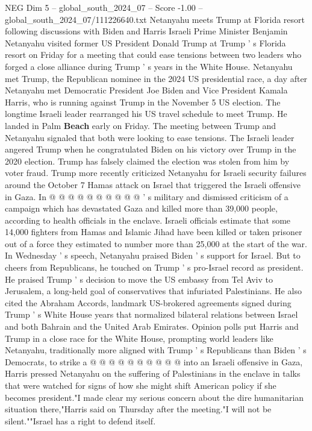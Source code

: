 \begin{textsample}{NEG Dim 5 – global\_south\_2024\_07 – Score -1.00 – global\_south\_2024\_07/111226640.txt}  \label{ex:f5_neg_291}
Netanyahu meets Trump at Florida resort following discussions with Biden and Harris Israeli Prime Minister Benjamin Netanyahu visited former US President Donald Trump at Trump ' s Florida resort on Friday for a meeting that could ease tensions between two leaders who forged a close alliance during Trump ' s years in the White House.
Netanyahu met Trump, the Republican nominee in the 2024 US presidential race, a day after Netanyahu met Democratic President Joe Biden and Vice President Kamala Harris, who is running against Trump in the November 5 US election.
The longtime Israeli leader rearranged his US travel schedule to meet Trump.
He landed in Palm \textbf{Beach} early on Friday.
The meeting between Trump and Netanyahu signaled that both were looking to ease tensions.
The Israeli leader angered Trump when he congratulated Biden on his victory over Trump in the 2020 election.
Trump has falsely claimed the election was stolen from him by voter fraud.
Trump more recently criticized Netanyahu for Israeli security failures around the October 7 Hamas attack on Israel that triggered the Israeli offensive in Gaza.
In @ @ @ @ @ @ @ @ @ @ ' s military and dismissed criticism of a campaign which has devastated Gaza and killed more than 39,000 people, according to health officials in the enclave.
Israeli officials estimate that some 14,000 fighters from Hamas and Islamic Jihad have been killed or taken prisoner out of a force they estimated to number more than 25,000 at the start of the war.
In Wednesday ' s speech, Netanyahu praised Biden ' s support for Israel.
But to cheers from Republicans, he touched on Trump ' s pro-Israel record as president.
He praised Trump ' s decision to move the US embassy from Tel Aviv to Jerusalem, a long-held goal of conservatives that infuriated Palestinians.
He also cited the Abraham Accords, landmark US-brokered agreements signed during Trump ' s White House years that normalized bilateral relations between Israel and both Bahrain and the United Arab Emirates.
Opinion polls put Harris and Trump in a close race for the White House, prompting world leaders like Netanyahu, traditionally more aligned with Trump ' s Republicans than Biden ' s Democrats, to strike a @ @ @ @ @ @ @ @ @ @ into an Israeli offensive in Gaza, Harris pressed Netanyahu on the suffering of Palestinians in the enclave in talks that were watched for signs of how she might shift American policy if she becomes president."I made clear my serious concern about the dire humanitarian situation there,"Harris said on Thursday after the meeting."I will not be silent.""Israel has a right to defend itself.

\end{textsample}
